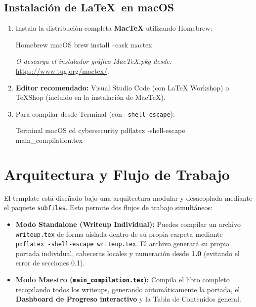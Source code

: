 \documentclass[../../main_compilation.tex]{subfiles}
\begin{document}
\subsection{Instalación de \LaTeX\ en macOS}
\begin{enumerate}
	\item Instala la distribución completa \textbf{MacTeX} utilizando Homebrew:
	      \begin{bashbox}{Homebrew macOS}
		      brew install --cask mactex
	      \end{bashbox}
	      \textit{O descarga el instalador gráfico MacTeX.pkg desde:} \url{https://www.tug.org/mactex/}.
	\item \textbf{Editor recomendado:} Visual Studio Code (con LaTeX Workshop) o TeXShop (incluido en la instalación de MacTeX).
	\item Para compilar desde Terminal (con \texttt{-shell-escape}):
	      \begin{bashbox}{Terminal macOS}
		      cd cybersecurity
		      pdflatex -shell-escape main_compilation.tex
	      \end{bashbox}
\end{enumerate}

\section{Arquitectura y Flujo de Trabajo}
El template está diseñado bajo una arquitectura modular y desacoplada mediante el paquete \texttt{subfiles}. Esto permite dos flujos de trabajo simultáneos:

\begin{infobox}
	\begin{itemize}
		\item \textbf{Modo Standalone (Writeup Individual):} Puedes compilar un archivo \texttt{writeup.tex} de forma aislada dentro de su propia carpeta mediante \texttt{pdflatex -shell-escape writeup.tex}. El archivo generará su propia portada individual, cabeceras locales y numeración desde \textbf{1.0} (evitando el error de secciones 0.1).
		\item \textbf{Modo Maestro (\texttt{main\_compilation.tex}):} Compila el libro completo recopilando todos los writeups, generando automáticamente la portada, el \textbf{Dashboard de Progreso interactivo} y la Tabla de Contenidos general.
	\end{itemize}
\end{infobox}
\end{document}
